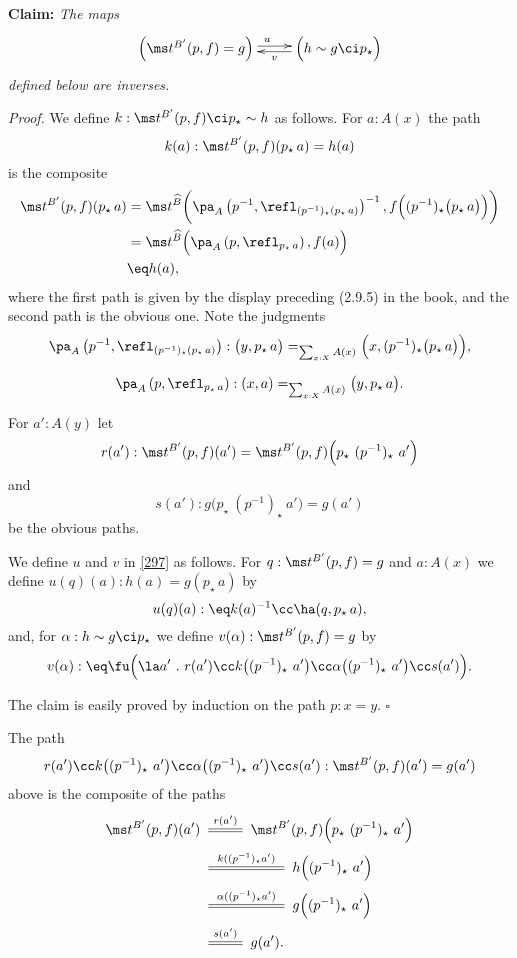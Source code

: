 \documentclass[12pt]{article}
\begin{document}
\nn\textbf{Claim:} \emph{The maps}
\begin{equation}\label{297}
\xymatrix{
\Big(\ms t^{B'}(p,f)=g\Big)\ar@<2pt>[r]^(.5)u&\Big(h\sim g\ci p_\star\Big)\ar@<2pt>[l]^(.45)v}
\end{equation}
\emph{defined below are inverses.}

\nn\emph{Proof.} We define $k:\ms t^{B'}(p,f)\ci p_\star\sim h$ as follows. For $a:A(x)$ the path 
$$
k(a):\ms t^{B'}(p,f)(p_\star\,a)=h(a)
$$ 
is the composite 
\begin{align*}
\ms t^{B'}(p,f)(p_\star\,a)&=\ms t^{\widehat B}\bigg(\pa_A\left(p^{-1},\refl_{(p^{-1})_\star(p_\star\,a)}\right)^{-1},f\Big((p^{-1})_\star\big(p_\star\,a\big)\Big)\bigg)\\ 
&=\ms t^{\widehat B}\Big(\pa_A\left(p,\refl_{p_\star\,a}\right),f(a)\Big)\\
&\eq h(a),
\end{align*} 
where the first path is given by the display preceding (2.9.5) in the book, and the second path is the obvious one. Note the judgments
$$
\pa_A\left(p^{-1},\refl_{(p^{-1})_\star(p_\star\,a)}\right):\big(y,p_\star\,a\big)=_{\sum_{x:X}A(x)}\Big(x,(p^{-1})_\star\big(p_\star\,a\big)\Big),
$$ 

$$
\pa_A\left(p,\refl_{p_\star\,a}\right):(x,a)=_{\sum_{x:X}A(x)}\big(y,p_\star\,a\big).
$$  

For $a':A(y)$ let 
$$
r(a'):\ms t^{B'}(p,f)(a')=\ms t^{B'}(p,f)\Big(p_\star\ (p^{-1})_\star\ a'\Big)
$$ 
and 
$$
s(a'):g\Big(p_\star\ (p^{-1})_\star\ a'\Big)=g(a')
$$ 
be the obvious paths. 

We define $u$ and $v$ in \eqref{297} as follows. For $q:\ms t^{B'}(p,f)=g$ and $a:A(x)$ we define $u(q)(a):h(a)=g(p_\star\,a)$ by 
$$ 
u(q)(a):\eq k(a)^{-1}\cc\ha(q,p_\star\,a), 
$$ 
and, for $\alpha:h\sim g\ci p_\star$ we define $v(\alpha):\ms t^{B'}(p,f)=g$ by 
$$
v(\alpha):\eq\fu\Big(\la a'\ .\ r(a')\cc k\big((p^{-1})_\star\ a'\big)\cc\alpha\big((p^{-1})_\star\ a'\big)\cc s(a')\Big).
$$ 

The claim is easily proved by induction on the path $p:x=y$. $\square$

The path 
$$
r(a')\cc k\big((p^{-1})_\star\ a'\big)\cc\alpha\big((p^{-1})_\star\ a'\big)\cc s(a'):\ms t^{B'}(p,f)(a')=g(a')
$$ 
above is the composite of the paths
\begin{align*}
\ms t^{B'}(p,f)(a')&\xymatrix{\ar@1{=}[r]^{r(a')}&}\ms t^{B'}(p,f)\Big(p_\star\ (p^{-1})_\star\ a'\Big)\\ 
&\xymatrix{\ar@1{=}[rr]^{k((p^{-1})_\star a')}&&}h\Big((p^{-1})_\star\ a'\Big)\\ 
&\xymatrix{\ar@1{=}[rr]^{\alpha((p^{-1})_\star a')}&&}g\Big((p^{-1})_\star\ a'\Big)\\ 
&\xymatrix{\ar@1{=}[r]^{s(a')}&}g(a').
\end{align*}
\end{document}
